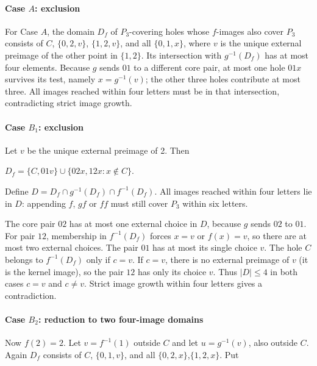 \documentclass[11pt]{article}
\theoremstyle{definition}
\theoremstyle{plain}
\begin{document}
\paragraph{Case \(A\): exclusion}\label{case-a-pure-exclusion}

For Case \(A\), the domain \(D_f\) of \(P_{3}\)-covering holes whose
\(f\)-images also cover \(P_{3}\) consists of \(C\), \(\{0,2,v\}\),
\(\{1,2,v\}\), and all \(\{0,1,x\}\), where \(v\) is the unique external
preimage of the other point in \(\{1,2\}\). Its intersection with
\(g^{-1}(D_f)\) has at most four elements. Because \(g\) sends
\(01\) to a different core pair, at most one hole \(01x\) survives its
test, namely \(x=g^{-1}(v)\); the other three holes contribute
at most three. All images reached within four letters must be in that
intersection, contradicting strict image growth.

\paragraph{Case \(B_{1}\): exclusion}\label{case-b_1-pure-exclusion}

Let \(v\) be the unique external preimage of 2. Then

\(D_f=\{C,01v\}\cup\{02x,12x:x\notin C\}.\)

Define \(D=D_f\cap g^{-1}(D_f)\cap f^{-1}(D_f)\). All images reached within four letters lie in
\(D\): appending \(f\), \(gf\) or \(ff\) must still cover \(P_{3}\) within six
letters.

The core pair \(02\) has at most one external choice in \(D\), because \(g\)
sends \(02\) to \(01\). For pair \(12\), membership in \(f^{-1}(D_f)\)
forces \(x=v\) or \(f(x)=v\), so there are at most two external choices.
The pair \(01\) has at most its single choice \(v\). The hole \(C\) belongs
to \(f^{-1}(D_f)\) only if \(c=v\). If \(c=v\), there is no
external preimage of \(v\) (it is the kernel image), so the pair \(12\) has
only its choice \(v\). Thus \(|D|\le 4\) in both cases \(c=v\) and
\(c\ne v\). Strict image growth within four letters gives a
contradiction.

\paragraph{Case \(B_{2}\): reduction to two four-image
domains}\label{case-b_2-reduction-to-two-four-image-domains}

Now \(f(2)=2\). Let \(v=f^{-1}(1)\) outside \(C\) and let
\(u=g^{-1}(v)\), also outside \(C\). Again \(D_f\) consists of
\(C\), \(\{0,1,v\}\), and all \(\{0,2,x\}\),\(\{1,2,x\}\). Put
\end{document}
